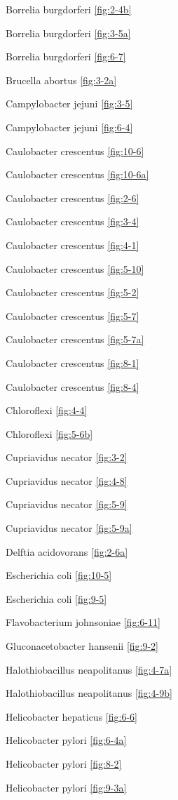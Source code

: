 \documentclass[]{tufte-book}
\begin{document}
Borrelia burgdorferi \ref{fig:2-4b}

Borrelia burgdorferi \ref{fig:3-5a}

Borrelia burgdorferi \ref{fig:6-7}

Brucella abortus \ref{fig:3-2a}

Campylobacter jejuni \ref{fig:3-5}

Campylobacter jejuni \ref{fig:6-4}

Caulobacter crescentus \ref{fig:10-6}

Caulobacter crescentus \ref{fig:10-6a}

Caulobacter crescentus \ref{fig:2-6}

Caulobacter crescentus \ref{fig:3-4}

Caulobacter crescentus \ref{fig:4-1}

Caulobacter crescentus \ref{fig:5-10}

Caulobacter crescentus \ref{fig:5-2}

Caulobacter crescentus \ref{fig:5-7}

Caulobacter crescentus \ref{fig:5-7a}

Caulobacter crescentus \ref{fig:8-1}

Caulobacter crescentus \ref{fig:8-4}

Chloroflexi \ref{fig:4-4}

Chloroflexi \ref{fig:5-6b}

Cupriavidus necator \ref{fig:3-2}

Cupriavidus necator \ref{fig:4-8}

Cupriavidus necator \ref{fig:5-9}

Cupriavidus necator \ref{fig:5-9a}

Delftia acidovorans \ref{fig:2-6a}

Escherichia coli \ref{fig:10-5}

Escherichia coli \ref{fig:9-5}

Flavobacterium johnsoniae \ref{fig:6-11}

Gluconacetobacter hansenii \ref{fig:9-2}

Halothiobacillus neapolitanus \ref{fig:4-7a}

Halothiobacillus neapolitanus \ref{fig:4-9b}

Helicobacter hepaticus \ref{fig:6-6}

Helicobacter pylori \ref{fig:6-4a}

Helicobacter pylori \ref{fig:8-2}

Helicobacter pylori \ref{fig:9-3a}
\end{document}

